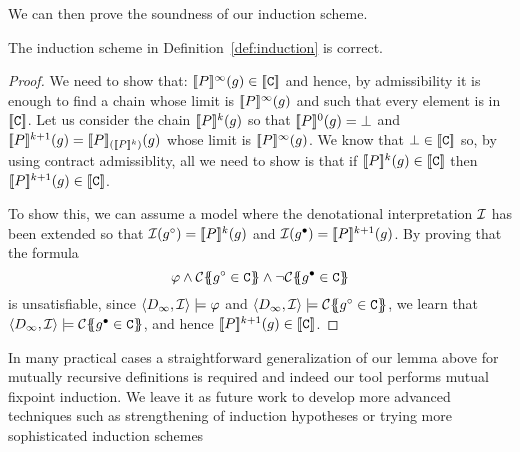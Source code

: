 We can then prove the soundness of our induction scheme.
\begin{theorem} The induction scheme in Definition~\ref{def:induction} is correct. \end{theorem}
\begin{proof} We need to show that: 
$\dbrace{P}^{\infty}(g) \in \dbrace{\Ct}$ and hence, by admissibility it is enough to find
a chain whose limit is $\dbrace{P}^{\infty}(g)$ and such that every element is in $\dbrace{\Ct}$.
Let us consider the chain $\dbrace{P}^{k}(g)$ so that $\dbrace{P}^0(g) = \bot$ and 
$\dbrace{P}^{k+1}(g) = \dbrace{P}_{(\dbrace{P}^{k})}(g)$ whose limit is $\dbrace{P}^{\infty}(g)$. We 
know that $\bot \in \dbrace{\Ct}$ so, by using contract admissiblity, all we need to show is
that if $\dbrace{P}^{k}(g) \in \dbrace{\Ct}$ then $\dbrace{P}^{k+1}(g) \in \dbrace{\Ct}$. 

To show this, we can assume a model where the denotational interpretation ${\cal I}$ has been 
extended so that ${\cal I}(g^{\circ}) = \dbrace{P}^{k}(g)$ and ${\cal I}(g^{\bullet}) = \dbrace{P}^{k+1}(g)$.
By proving that the formula 
\[ \phi \land \ctrans{}{}{g^{\circ} \in \Ct} \land \neg \ctrans{}{}{g^{\bullet} \in \Ct} \] 
is unsatisfiable, since $\langle D_{\infty},{\cal I}\rangle \models \phi$ and 
$\langle D_{\infty},{\cal I}\rangle \models \ctrans{}{}{g^{\circ} \in \Ct}$, we learn 
that $\langle D_{\infty},{\cal I}\rangle \models \ctrans{}{}{g^{\bullet} \in \Ct}$, 
and hence $\dbrace{P}^{k+1}(g) \in \dbrace{\Ct}$.
\end{proof} 

In many practical cases a straightforward generalization of our lemma above for mutually recursive definitions
is required and indeed our tool performs mutual fixpoint induction. We leave it as future work to develop
more advanced techniques such as strengthening of induction hypotheses or trying more sophisticated induction 
schemes~\cite{dan's master thesis??}  


